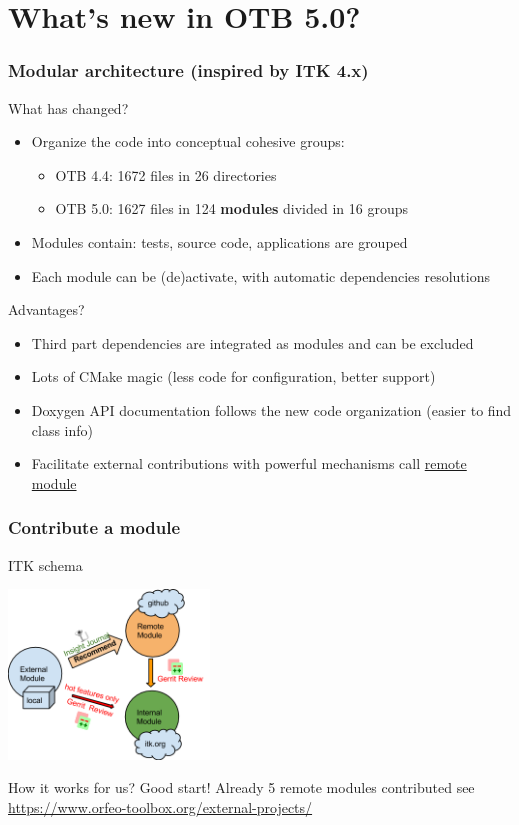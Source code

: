 \documentclass[8pt]{beamer}
\begin{document}
\section{What's new in OTB 5.0?}

\begin{frame}
\frametitle{Modular architecture (inspired by ITK 4.x)}
\begin{block}{What has changed?}
\begin{itemize}
\item  Organize the code into conceptual cohesive groups:
  \begin{itemize}
    \item OTB 4.4: 1672 files in 26 directories
    \item OTB 5.0: 1627 files in 124 \textbf{modules} divided in 16 groups
  \end{itemize}
\item Modules contain: tests, source code, applications are grouped
\item Each module can be (de)activate, with automatic dependencies resolutions
\end{itemize}
\end{block}

\begin{block}{Advantages?}
\begin{itemize}
\item Third part dependencies are integrated as modules and can be excluded
\item Lots of CMake magic (less code for configuration, better support)
\item Doxygen API documentation follows the new code organization (easier to
  find class info)
\item Facilitate external contributions with powerful mechanisms call
  \href{https://www.orfeo-toolbox.org/external-projects/}{\alert{remote module}}
\end{itemize}
\end{block}
\end{frame}

\begin{frame}
\frametitle{Contribute a module}
\begin{block}{ITK schema}
\begin{center}
 \includegraphics[width=0.4\textwidth]{images/itk-remote-module.png}
\end{center}

\end{block}
\begin{block}{How it works for us?}
Good start! Already 5 remote modules contributed see \url{https://www.orfeo-toolbox.org/external-projects/}
\end{block}
\end{frame}
\end{document}
